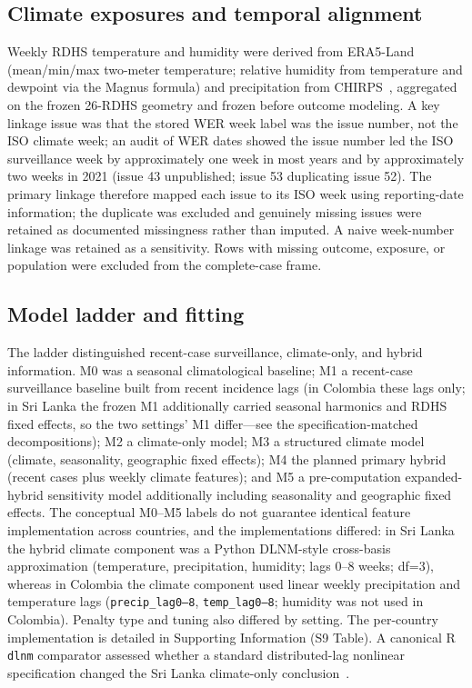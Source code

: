 \documentclass[11pt,a4paper]{article}
\begin{document}
\subsection{Climate exposures and temporal alignment}
Weekly RDHS temperature and humidity were derived from ERA5-Land~\cite{MunozSabater2021,ERA5LandCDS} (mean/min/max two-meter temperature; relative humidity from temperature and dewpoint via the Magnus formula) and precipitation from CHIRPS~\cite{Funk2015,CHIRPS}, aggregated on the frozen 26-RDHS geometry and frozen before outcome modeling. A key linkage issue was that the stored WER week label was the issue number, not the ISO climate week; an audit of WER dates showed the issue number led the ISO surveillance week by approximately one week in most years and by approximately two weeks in 2021 (issue 43 unpublished; issue 53 duplicating issue 52). The primary linkage therefore mapped each issue to its ISO week using reporting-date information; the duplicate was excluded and genuinely missing issues were retained as documented missingness rather than imputed. A naive week-number linkage was retained as a sensitivity. Rows with missing outcome, exposure, or population were excluded from the complete-case frame.

\subsection{Model ladder and fitting}
The ladder distinguished recent-case surveillance, climate-only, and hybrid information. M0 was a seasonal climatological baseline; M1 a recent-case surveillance baseline built from recent incidence lags (in Colombia these lags only; in Sri Lanka the frozen M1 additionally carried seasonal harmonics and RDHS fixed effects, so the two settings' M1 differ---see the specification-matched decompositions); M2 a climate-only model; M3 a structured climate model (climate, seasonality, geographic fixed effects); M4 the planned primary hybrid (recent cases plus weekly climate features); and M5 a pre-computation expanded-hybrid sensitivity model additionally including seasonality and geographic fixed effects. The conceptual M0--M5 labels do not guarantee identical feature implementation across countries, and the implementations differed: in Sri Lanka the hybrid climate component was a Python DLNM-style cross-basis approximation (temperature, precipitation, humidity; lags 0--8 weeks; df=3), whereas in Colombia the climate component used linear weekly precipitation and temperature lags (\texttt{precip\_lag0--8}, \texttt{temp\_lag0--8}; humidity was not used in Colombia). Penalty type and tuning also differed by setting. The per-country implementation is detailed in Supporting Information (S9 Table). A canonical R \texttt{dlnm} comparator assessed whether a standard distributed-lag nonlinear specification changed the Sri Lanka climate-only conclusion~\cite{Gasparrini2010,Gasparrini2011}.
\end{document}
